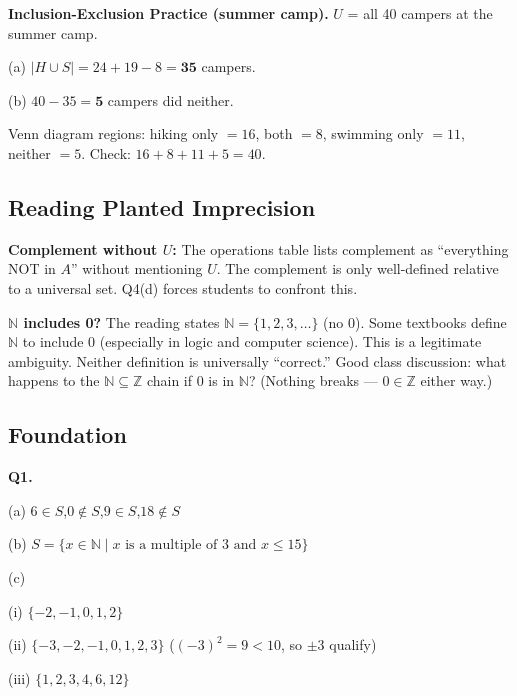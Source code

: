 \documentclass[12pt]{article}
\begin{document}
\textbf{Inclusion-Exclusion Practice (summer camp).}\;
$U$ = all 40 campers at the summer camp.

(a)\; $|H \cup S| = 24 + 19 - 8 = \mathbf{35}$ campers.

(b)\; $40 - 35 = \mathbf{5}$ campers did neither.

Venn diagram regions: hiking only $= 16$, both $= 8$, swimming only $= 11$, neither $= 5$.
Check: $16 + 8 + 11 + 5 = 40$. \checkmark

\subsection*{Reading Planted Imprecision}

\textbf{Complement without $U$:} The operations table lists complement as ``everything NOT in $A$'' without mentioning $U$.
The complement is only well-defined relative to a universal set.
Q4(d) forces students to confront this.

\textbf{$\mathbb{N}$ includes 0?} The reading states $\mathbb{N} = \{1,2,3,\ldots\}$ (no 0).
Some textbooks define $\mathbb{N}$ to include 0 (especially in logic and computer science).
This is a legitimate ambiguity. Neither definition is universally ``correct.''
Good class discussion: what happens to the $\mathbb{N} \subseteq \mathbb{Z}$ chain if 0 is in $\mathbb{N}$?
(Nothing breaks --- $0 \in \mathbb{Z}$ either way.)

\subsection*{Foundation}

\bigskip
\textbf{Q1.}

(a)\; $6 \in S$,\quad $0 \notin S$,\quad $9 \in S$,\quad $18 \notin S$

(b)\; $S = \{x \in \mathbb{N} \mid x \text{ is a multiple of 3 and } x \leq 15\}$

(c)

\hspace{1.5em}(i)\; $\{-2,-1,0,1,2\}$

\hspace{1.5em}(ii)\; $\{-3,-2,-1,0,1,2,3\}$ \quad ($(-3)^2 = 9 < 10$, so $\pm 3$ qualify)

\hspace{1.5em}(iii)\; $\{1,2,3,4,6,12\}$
\end{document}
